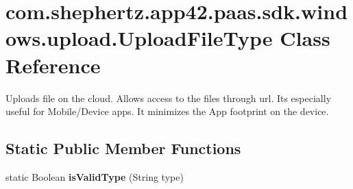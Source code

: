 \hypertarget{classcom_1_1shephertz_1_1app42_1_1paas_1_1sdk_1_1windows_1_1upload_1_1_upload_file_type}{\section{com.\+shephertz.\+app42.\+paas.\+sdk.\+windows.\+upload.\+Upload\+File\+Type Class Reference}
\label{classcom_1_1shephertz_1_1app42_1_1paas_1_1sdk_1_1windows_1_1upload_1_1_upload_file_type}
}


Uploads file on the cloud. Allows access to the files through url. Its especially useful for Mobile/\+Device apps. It minimizes the App footprint on the device.  


\subsection*{Static Public Member Functions}
\begin{DoxyCompactItemize}
\item 
\hypertarget{classcom_1_1shephertz_1_1app42_1_1paas_1_1sdk_1_1windows_1_1upload_1_1_upload_file_type_a7fd085dad053d100731407b17fdba5f8}{static Boolean {\bfseries is\+Valid\+Type} (String type)}\label{classcom_1_1shephertz_1_1app42_1_1paas_1_1sdk_1_1windows_1_1upload_1_1_upload_file_type_a7fd085dad053d100731407b17fdba5f8}

\end{DoxyCompactItemize}
